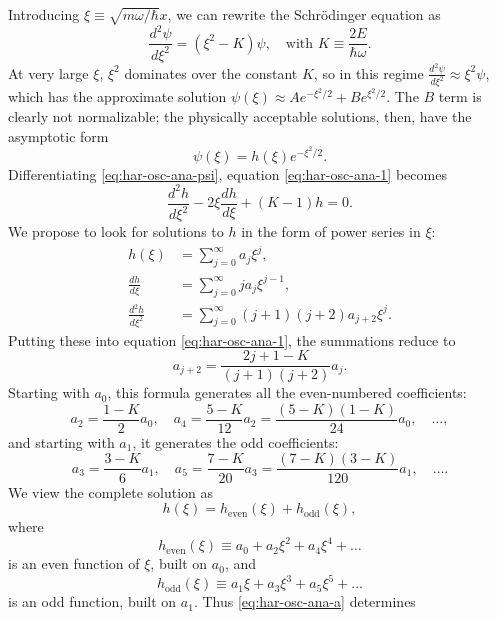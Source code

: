 \documentclass{article}
\begin{document}
Introducing $\xi \equiv \sqrt{m\omega/\hbar}x$, we can rewrite the
Schr\"{o}dinger equation as
\begin{equation} \label{eq:har-osc-ana-1}
  \frac{d^2\psi}{d\xi^2} = (\xi^2 - K)\psi,\quad
  \text{with } K \equiv \frac{2E}{\hbar\omega}.
\end{equation}
At very large $\xi$, $\xi^2$ dominates over the constant $K$, so in this regime 
$\frac{d^2\psi}{d\xi^2} \approx \xi^2\psi$, which has the approximate solution
$\psi(\xi) \approx Ae^{-\xi^2/2} + Be^{\xi^2/2}$. The $B$ term is clearly not
normalizable; the physically acceptable solutions, then, have the asymptotic
form
\begin{equation} \label{eq:har-osc-ana-psi}
  \psi(\xi) = h(\xi)e^{-\xi^2/2}.
\end{equation}
Differentiating \eqref{eq:har-osc-ana-psi}, equation \eqref{eq:har-osc-ana-1}
becomes
\begin{equation} \label{eq:har-osc-ana-2}
  \frac{d^2h}{d\xi^2} - 2\xi\frac{dh}{d\xi} + (K - 1)h = 0.
\end{equation}
We propose to look for solutions to $h$ in the form of power series in $\xi$:
\begin{align*}
  h(\xi) &= \sum_{j=0}^{\infty} a_j\xi^j, \\
  \frac{dh}{d\xi} &= \sum_{j=0}^{\infty} ja_j\xi^{j-1}, \\
  \frac{d^2h}{d\xi^2} &= \sum_{j=0}^{\infty} (j+1)(j+2)a_{j+2}\xi^j.
\end{align*}
Putting these into equation \eqref{eq:har-osc-ana-1}, the summations reduce to
\begin{equation} \label{eq:har-osc-ana-a}
  a_{j+2} = \frac{2j + 1 - K}{(j+1)(j+2)}a_j.
\end{equation}
Starting with $a_0$, this formula generates all the even-numbered coefficients:
\[
  a_2 = \frac{1 - K}{2}a_0, \quad
  a_4 = \frac{5 - K}{12}a_2 = \frac{(5 - K)(1 - K)}{24}a_0, \quad
  \ldots,
\] and starting with $a_1$, it generates the odd coefficients: \[
  a_3 = \frac{3 - K}{6}a_1, \quad
  a_5 = \frac{7 - K}{20}a_3 = \frac{(7 - K)(3 - K)}{120}a_1, \quad
  \ldots.
\] We view the complete solution as
\begin{equation} \label{eq:har-osc-ana-h-2}
  h(\xi) = h_{\mathrm{even}}(\xi) + h_{\mathrm{odd}}(\xi),
\end{equation} where \[
  h_{\mathrm{even}}(\xi) \equiv a_0 + a_2\xi^2 + a_4\xi^4 + \ldots
\] is an even function of $\xi$, built on $a_0$, and \[
h_{\mathrm{odd}}(\xi) \equiv a_1\xi + a_3\xi^3 + a_5\xi^5 + \ldots
\] is an odd function, built on $a_1$. Thus \eqref{eq:har-osc-ana-a} determines
\end{document}
